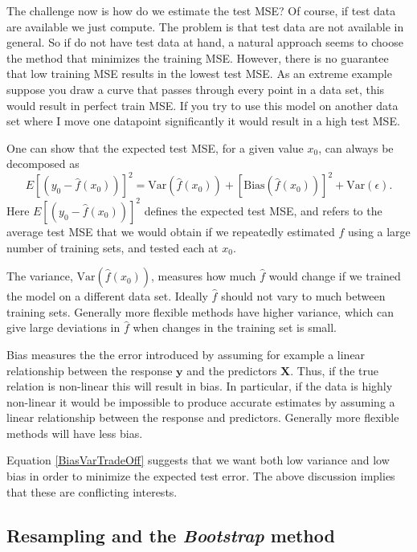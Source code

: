 \documentclass[a4paper]{article}
\begin{document}
\begin{multicols}{2}
The challenge now is how do we estimate the test MSE? Of course, if test data are available we just compute. The problem is  
that test data are not available in general. So if do not have test data at hand, a natural approach seems to choose 
the method that minimizes the training MSE. However, there is no guarantee that low training MSE results in the lowest test MSE. 
As an extreme example suppose you draw a curve that passes through every point in a data set, this would result in perfect train 
MSE. If you try to use this model on another data set where I move one datapoint significantly it would result in a high test MSE.

One can show that the expected test MSE, for a given value $x_0$, can always be decomposed as 
\begin{equation}
 E[(y_0 - \hat{f}(x_0))]^2 = \text{Var}(\hat{f}(x_0)) + [\text{Bias}(\hat{f}(x_0))]^2 + \text{Var}(\epsilon) \label{BiasVarTradeOff}.
\end{equation}
Here $E[(y_0 - \hat{f}(x_0))]^2$ defines the expected test MSE, and refers
to the average test MSE that we would obtain if we repeatedly estimated $f$ using a large number of training sets, 
and tested each at $x_0$. 

The variance, $\text{Var}(\hat{f}(x_0))$, measures how much $\hat{f}$ would change if we trained the 
model on a different data set. Ideally $\hat{f}$ should not vary to much between training sets. Generally more flexible methods 
have higher variance, which can give large deviations in $\hat{f}$ when changes in the training set is small.

Bias measures the the error introduced by assuming for example a linear relationship between the response $\mathbf{y}$ and the 
predictors $\mathbf{X}$. Thus, if the true relation is non-linear this will result in bias. In particular, if the data is highly 
non-linear it would be impossible to produce accurate estimates by assuming a linear relationship between the response and predictors.
Generally more flexible methods will have less bias. 

Equation \ref{BiasVarTradeOff} suggests that we want both low variance and low bias in order to minimize the expected 
test error. The above discussion implies that these are conflicting interests. 


\subsection{Resampling and the \textit{Bootstrap} method \label{sect:resampling}}
\lipsum[3]


\end{multicols}
\end{document}
